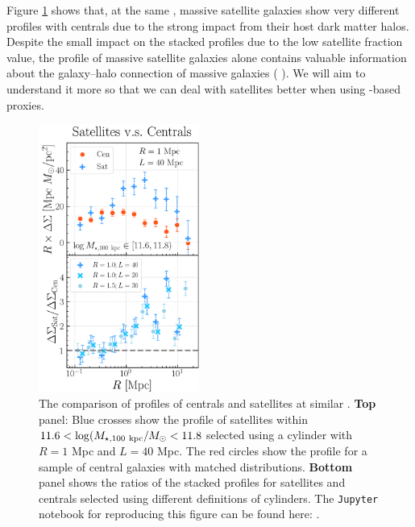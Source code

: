 \documentclass[fleqn,usenatbib,useAMS]{mnras}
\begin{document}
    Figure \ref{fig:sat_cen} shows that, at the same \mstar{}, massive satellite galaxies show 
    very different \dsigma{} profiles with centrals due to the strong impact from their host 
    dark matter halos.
    Despite the small impact on the stacked \dsigma{} profiles due to the low satellite fraction 
    value, the \dsigma{} profile of massive satellite galaxies alone contains valuable information 
    about the galaxy--halo connection of massive galaxies (\eg{} \citealt{Sifon2015, Li2016,
    Dvornik2020}).
    We will aim to understand it more so that we can deal with satellites better when using 
    \mstar{}-based \mvir{} proxies.

\begin{figure}
    \centering
    \includegraphics[width=0.47\textwidth]{figure/fig_D1}
    \caption{
        The comparison of \dsigma{} profiles of centrals and satellites at similar \mstar{}.
        \textbf{Top} panel: Blue crosses show the \dsigma{} profile of satellites within 
        $11.6 < \log (M_{\star, 100\ \rm kpc}/M_{\odot} < 11.8$ selected using a cylinder with $R=1$
        Mpc and $L=40$ Mpc. 
        The red circles show the \dsigma{} profile for a sample of central galaxies with matched 
        \mstar{} distributions.
        \textbf{Bottom} panel shows the ratios of the stacked \dsigma{} profiles for satellites 
        and centrals selected using different definitions of cylinders.
        The \texttt{Jupyter} notebook for reproducing this figure can be found here:
        \href{https://github.com/dr-guangtou/jianbing/blob/master/notebooks/figure/figD1.ipynb}{\faGithub}.
    }
    \label{fig:sat_cen}
\end{figure}
\end{document}
